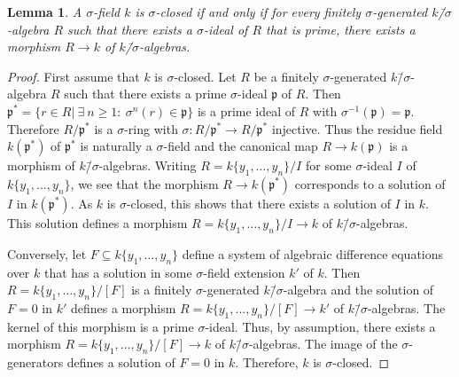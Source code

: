 \documentclass[oneside,reqno]{amsart}
\newtheorem{lemma}[theo]{Lemma}
\theoremstyle{definition}
\newcommand{\p}{\mathfrak{p}}
\newcommand{\Hom}{\operatorname{Hom}}
\newcommand{\s}{\sigma}
\newcommand{\ks}{$k$\=/$\s$}
\begin{document}
\begin{lemma} \label{lemma: sclosed}
	A $\s$-field $k$ is $\s$-closed if and only if for every finitely $\s$-generated \ks-algebra $R$ such that there exists a $\s$-ideal of $R$ that is prime, there exists a morphism $R\to k$ of \ks-algebras.
\end{lemma}	
\begin{proof}
	First assume that $k$ is $\s$-closed. Let $R$ be a finitely $\s$-generated \ks-algebra $R$ such that there exists a prime $\s$-ideal $\p$ of $R$. Then $\p^*=\{r\in R|\ \exists\ n\geq 1:\ \s^n(r)\in \p\}$ is a prime ideal of $R$ with $\s^{-1}(\p)=\p$. Therefore $R/\p^*$ is a $\s$-ring with $\s\colon R/\p^*\to R/\p^*$ injective. Thus the residue field $k(\p^*)$ of $\p^*$ is naturally a $\s$-field and the canonical map $R\to k(\p)$ is a morphism of \ks-algebras.
	Writing $R=k\{y_1,\ldots,y_n\}/I$ for some $\s$-ideal $I$ of $k\{y_1,\ldots,y_n\}$, we see that the morphism $R\to k(\p^*)$ corresponds to a solution of $I$ in $k(\p^*)$. As $k$ is $\s$-closed, this shows that there exists a solution of $I$ in $k$. This solution defines a morphism $R=k\{y_1,\ldots,y_n\}/I\to k$ of \ks-algebras.
	
	Conversely, let $F\subseteq k\{y_1,\ldots,y_n\}$ define a system of algebraic difference equations over $k$ that has a solution in some $\s$-field extension $k'$ of $k$. Then $R=k\{y_1,\ldots,y_n\}/[F]$ is a finitely $\s$-generated \ks-algebra and the solution of $F=0$ in $k'$ defines a morphism $R=k\{y_1,\ldots,y_n\}/[F]\to k'$ of \ks-algebras. The kernel of this morphism is a prime $\s$-ideal. Thus, by assumption, there exists a morphism $R=k\{y_1,\ldots,y_n\}/[F]\to k$ of \ks-algebras. The image of the $\s$-generators defines a solution of $F=0$ in $k$. Therefore, $k$ is $\s$-closed.
%	 
\end{proof}
\end{document}
